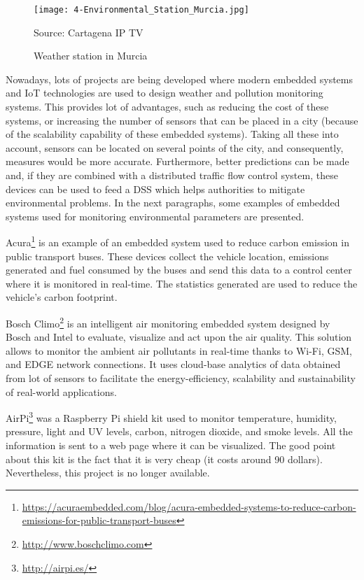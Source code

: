 \begin{figure}[!h]
	\begin{center}
		\texttt{[image: 4-Environmental\_Station\_Murcia.jpg]}
		\caption{Weather station in Murcia}
		\label{fig:4-Environmental_Station_Murcia}{Source: Cartagena IP TV}
	\end{center}
\end{figure}

Nowadays, lots of projects are being developed where modern embedded systems and IoT technologies are used to design weather and pollution monitoring systems. This provides lot of advantages, such as reducing the cost of these systems, or increasing the number of sensors that can be placed in a city (because of the scalability capability of these embedded systems). Taking all these into account, sensors can be located on several points of the city, and consequently, measures would be more accurate. Furthermore, better predictions can be made and, if they are combined with a distributed traffic flow control system, these devices can be used to feed a \ac{DSS} which helps authorities to mitigate environmental problems. In the next paragraphs, some examples of embedded systems used for monitoring environmental parameters are presented.

Acura\footnote{\url{https://acuraembedded.com/blog/acura-embedded-systems-to-reduce-carbon-emissions-for-public-transport-buses}} is an example of an embedded system used to reduce carbon emission in public transport buses. These devices collect the vehicle location, emissions generated and fuel consumed by the buses and send this data to a control center where it is monitored in real-time. The statistics generated are used to reduce the vehicle's carbon footprint.

Bosch Climo\footnote{\url{http://www.boschclimo.com}} is an intelligent air monitoring embedded system designed by Bosch and Intel to evaluate, visualize and act upon the air quality. This solution allows to monitor the ambient air pollutants in real-time thanks to Wi-Fi, GSM, and EDGE network connections. It uses cloud-base analytics of data obtained from lot of sensors to facilitate the energy-efficiency, scalability and sustainability of real-world applications.

AirPi\footnote{\url{http://airpi.es/}} was a Raspberry Pi shield kit used to monitor temperature, humidity, pressure, light and UV levels, carbon, nitrogen dioxide, and smoke levels. All the information is sent to a web page where it can be visualized. The good point about this kit is the fact that it is very cheap (it costs around 90 dollars).  Nevertheless, this project is no longer available.



